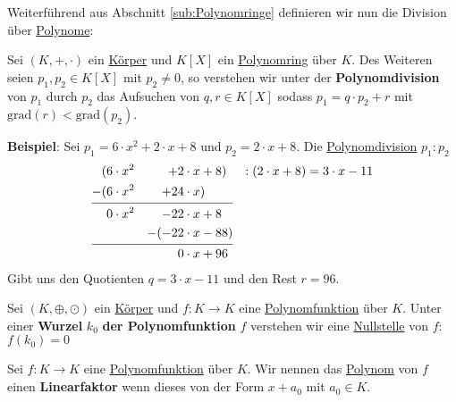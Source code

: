 \documentclass[../../main.tex]{subfiles}
\begin{document}
		Weiterführend aus Abschnitt \ref{sub:Polynomringe} definieren wir nun die Division über \hyperref[def:Polynom]{Polynome}:
		
		\begin{definition}[Polynomdivision]
			\label{def:Polynomdivision}
			Sei $(K,+,\cdot)$ ein \hyperref[def:Körper]{Körper} und $K[X]$ ein \hyperref[def:Polynomring]{Polynomring} über $K$. Des Weiteren seien $p_1,p_2 \in K[X]$ mit $p_2 \not = 0$, so verstehen wir unter der \textbf{Polynomdivision} von $p_1$ durch $p_2$ das Aufsuchen von $q,r \in K[X]$ sodass $p_1 = q \cdot p_2 + r$ mit $\textrm{grad}(r) < \textrm{grad}(p_2)$.
		\end{definition}
	
		\textbf{Beispiel}: Sei $p_1 = 6 \cdot x^2 + 2 \cdot x + 8$ und $p_2 = 2 \cdot x + 8$. Die \hyperref[def:Polynomdivision]{Polynomdivision} $p_1:p_2$
		\begin{alignat*}{5}
			( &6 \cdot x^2  &+  2 \cdot x &+ 8)              & :(2\cdot x + 8) = 3 \cdot x - 11 \\
			-(&6\cdot x^2   &+  24\cdot x &)  \\[-2ex]
			\cline{1-4} \\[-4.5ex]
			  &0\cdot x^2   &-  22 \cdot x &+ 8 \\	
			  &             &-(-22 \cdot x &- 88) \\[-2ex]
			\cline{1-4} \\[-4.5ex]
			  &             &    0 \cdot x &+ 96 
		\end{alignat*}
		Gibt uns den Quotienten $q = 3 \cdot x - 11$ und den Rest $r=96$.
		
		\begin{definition}
			\label{def:Wurzel}
			Sei $(K,\oplus, \odot)$ ein \hyperref[def:Körper]{Körper} und $f:K\rightarrow K$ eine \hyperref[def:Polynomfunktion]{Polynomfunktion} über $K$. Unter einer \textbf{Wurzel} $k_0$ \textbf{der Polynomfunktion} $f$ verstehen wir eine \hyperref[def:Nullstelle]{Nullstelle} von $f$: $f(k_0)=0$
		\end{definition}
		
		\begin{definition}[Linearfaktor]
			\label{def:Linearfaktor}
			Sei $f: K \rightarrow K$ eine \hyperref[def:Polynomfunktion]{Polynomfunktion} über $K$. Wir nennen das \hyperref[def:Polynom]{Polynom} von $f$ einen \textbf{Linearfaktor} wenn dieses von der Form $x + a_0$ mit $a_0 \in K$.
		\end{definition}
		
\end{document}
